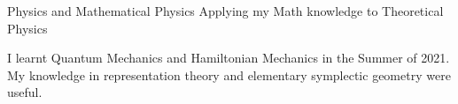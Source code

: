 \HeadingItemListStart
	\HeadingItem
		{Physics and Mathematical Physics}{}
		{Applying my Math knowledge to Theoretical Physics}{}
		\ItemListStart
			\item I learnt Quantum Mechanics and Hamiltonian Mechanics in the Summer of 2021. My knowledge in representation theory and elementary symplectic geometry were useful.
		\ItemListEnd
\HeadingItemListEnd

